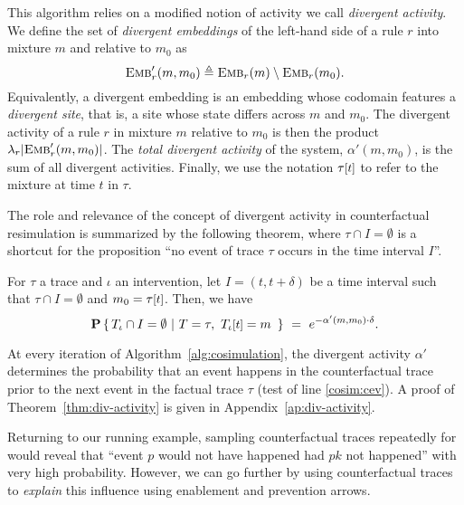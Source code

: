 This algorithm relies on a modified notion of activity we call
\emph{divergent activity}. We define the set of \emph{divergent
  embeddings} of the left-hand side of a rule $r$ into mixture $m$
and relative to $m_0$ as
\[{\textsc{Emb}}'_{r}(m, m_0) \triangleq {\textsc{Emb}}_{r}(m) \setminus {\textsc{Emb}}_{r}(m_0).\]
Equivalently, a divergent embedding is an embedding whose codomain
features a \emph{divergent site}, that is, a site whose state differs
across $m$ and $m_0$. The {divergent activity} of a rule $r$ in
mixture $m$ relative to $m_0$ is then the product
$\lambda_r|{\textsc{Emb}}'_{r}(m, m_0)|$. The \emph{total divergent activity} of
the system, $\alpha'(m, m_0)$, is the sum of all divergent
activities. Finally, we use the notation $\TSTATE{t}{\tau}$ to refer
to the mixture at time $t$ in $\tau$.




The role and relevance of the concept of divergent activity in
counterfactual resimulation is summarized by the
following theorem, where $\tau \cap I = \emptyset$ is a
shortcut for the proposition ``no event of trace $\tau$ occurs in
the time interval $I$''.
\begin{theorem}\label{thm:div-activity}
  For $\tau$ a trace
  and $\iota$ an intervention, let $I = (t, t+\delta)$ be a time interval
  such that $\tau \cap I = \emptyset$ and $m_0 =
  \TSTATE{t}{\tau}$. Then, we have
  \[\CProb{ \ATRAJ{} \cap I = \emptyset }{ T=\tau,\
      \TSTATE{t}{\ATRAJ{}} = m\ }
    \ =\ e^{-\alpha'(m, m_0) \cdot \delta}.
  \]
\end{theorem}
\noindent At every iteration of Algorithm~\ref{alg:cosimulation}, the
divergent activity $\alpha'$ determines the probability that an event
happens in the counterfactual trace prior to the next event in the
factual trace $\tau$ (test of line \ref{cosim:cev}).  A proof of
Theorem~\ref{thm:div-activity} is given in
Appendix~\ref{ap:div-activity}.

Returning to our running example, sampling counterfactual traces
repeatedly for \RefTrace{} would reveal that ``event $p$ would not
have happened had $pk$ not happened'' with very high probability.
However, we can go further by using counterfactual traces to
\textit{explain} this influence using enablement and prevention
arrows.
